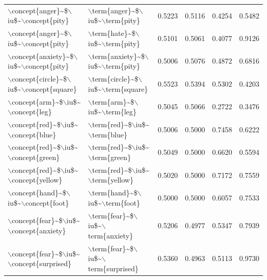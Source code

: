 \begin{table}[ht]
\begin{tabular}{llrrrr}
  $\backslash$concept\{anger\}\~{}\$$\backslash$iu\$\~{}$\backslash$concept\{pity\} & $\backslash$term\{anger\}\~{}\$$\backslash$iu\$\~{}$\backslash$term\{pity\} & 0.5223 & 0.5116 & 0.4254 & 0.5482 \\ 
  $\backslash$concept\{anger\}\~{}\$$\backslash$iu\$\~{}$\backslash$concept\{pity\} & $\backslash$term\{hate\}\~{}\$$\backslash$iu\$\~{}$\backslash$term\{pity\} & 0.5101 & 0.5061 & 0.4077 & 0.9126 \\ 
  $\backslash$concept\{anxiety\}\~{}\$$\backslash$iu\$\~{}$\backslash$concept\{pity\} & $\backslash$term\{anxiety\}\~{}\$$\backslash$iu\$\~{}$\backslash$term\{pity\} & 0.5006 & 0.5076 & 0.4872 & 0.6816 \\ 
  $\backslash$concept\{circle\}\~{}\$$\backslash$iu\$\~{}$\backslash$concept\{square\} & $\backslash$term\{circle\}\~{}\$$\backslash$iu\$\~{}$\backslash$term\{square\} & 0.5523 & 0.5394 & 0.5302 & 0.4203 \\ 
  $\backslash$concept\{arm\}\~{}\$$\backslash$iu\$\~{}$\backslash$concept\{leg\} & $\backslash$term\{arm\}\~{}\$$\backslash$iu\$\~{}$\backslash$term\{leg\} & 0.5045 & 0.5066 & 0.2722 & 0.3476 \\ 
  $\backslash$concept\{red\}\~{}\$$\backslash$iu\$\~{}$\backslash$concept\{blue\} & $\backslash$term\{red\}\~{}\$$\backslash$iu\$\~{}$\backslash$term\{blue\} & 0.5006 & 0.5000 & 0.7458 & 0.6222 \\ 
  $\backslash$concept\{red\}\~{}\$$\backslash$iu\$\~{}$\backslash$concept\{green\} & $\backslash$term\{red\}\~{}\$$\backslash$iu\$\~{}$\backslash$term\{green\} & 0.5049 & 0.5000 & 0.6620 & 0.5594 \\ 
  $\backslash$concept\{red\}\~{}\$$\backslash$iu\$\~{}$\backslash$concept\{yellow\} & $\backslash$term\{red\}\~{}\$$\backslash$iu\$\~{}$\backslash$term\{yellow\} & 0.5020 & 0.5000 & 0.7172 & 0.7559 \\ 
  $\backslash$concept\{hand\}\~{}\$$\backslash$iu\$\~{}$\backslash$concept\{foot\} & $\backslash$term\{hand\}\~{}\$$\backslash$iu\$\~{}$\backslash$term\{foot\} & 0.5000 & 0.5000 & 0.6057 & 0.7533 \\ 
  $\backslash$concept\{fear\}\~{}\$$\backslash$iu\$\~{}$\backslash$concept\{anxiety\} & $\backslash$term\{fear\}\~{}\$$\backslash$iu\$\~{}$\backslash$term\{anxiety\} & 0.5206 & 0.4977 & 0.5347 & 0.7939 \\ 
  $\backslash$concept\{fear\}\~{}\$$\backslash$iu\$\~{}$\backslash$concept\{surprised\} & $\backslash$term\{fear\}\~{}\$$\backslash$iu\$\~{}$\backslash$term\{surprised\} & 0.5360 & 0.4963 & 0.5113 & 0.9730 \\ 

\end{tabular}
\end{table}

